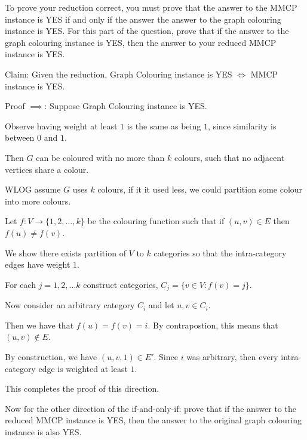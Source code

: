 \begin{questions}
	\question[3] To prove your reduction correct, you must prove that the answer to the MMCP instance is YES if and only if the answer the answer to the graph colouring instance is YES. For this part of the question, prove that if the answer to the graph colouring instance is YES, then the answer to your reduced MMCP instance is YES.

	\ifsolutions\fi

	\begin{soln}
		Claim: Given the reduction, Graph Colouring instance is YES \(\iff\) MMCP instance is YES.

		Proof \(\implies\): Suppose Graph Colouring instance is YES.

		Observe having weight at least \(1\) is the same as being \(1\), since similarity is between \(0\) and \(1\).

		Then \(G\) can be coloured with no more than \(k\) colours, such that no adjacent vertices share a colour.

		WLOG assume \(G\) uses \(k\) colours, if it it used less, we could partition some colour into more colours.

		Let \(f:V \to \{1, 2, \dots, k\}\) be the colouring function such that if \((u, v) \in E\) then \(f(u) \neq f(v)\).

		We show there exists partition of \(V\) to \(k\) categories so that the intra-category edges have weight \(1\).

		For each \(j = 1, 2, \dots k\) construct categories, \(C_j = \{v \in V : f(v) = j\}\).

		Now consider an arbitrary category \(C_i\) and let \(u, v \in C_i\).

		Then we have that \(f(u) = f(v) = i\). By contrapostion, this means that \((u, v) \notin E\).

		By construction, we have \((u, v, 1) \in E'\). Since \(i\) was arbitrary, then every intra-category edge is weighted at least \(1\).

		This completes the proof of this direction.





	\end{soln}

	\question[3] Now for the other direction of the if-and-only-if: prove that if the answer to the reduced MMCP instance is YES, then the answer to the original graph colouring instance is also YES.

	\ifsolutions\fi


\end{questions}
